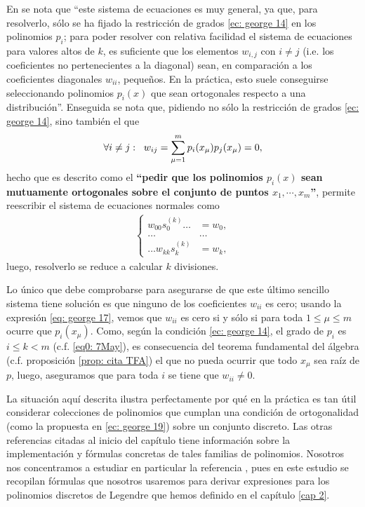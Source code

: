 \noindent
En \cite{george} se nota que ``este sistema de ecuaciones
es muy general, ya que, para resolverlo, sólo se ha fijado la 
restricción de grados
\eqref{ec: george 14} en los polinomios $p_{i}$; para poder
resolver con relativa facilidad el sistema
de ecuaciones para valores altos de $k$, es suficiente
que los elementos $w_{i,j}$ con $i \neq j$
(i.e. los coeficientes no pertenecientes a la 
diagonal) sean, en comparación a los coeficientes diagonales
$w_{ii}$, pequeños. En la práctica, esto suele conseguirse 
seleccionando polinomios $p_{i}(x)$ que sean ortogonales
respecto a una distribución''.
Enseguida se nota que, pidiendo no sólo 
la restricción de grados \eqref{ec: george 14}, sino también
el que
\begin{equation}
\label{ec: george 19}
\forall i \neq j: \hspace{0.2cm}
w_{ij} = \sum\limits_{\mu=1}^{m}p_{i}(x_{\mu}) p_{j} (x_{\mu}) = 0,
\end{equation}
hecho que es descrito como el 
\textbf{``pedir que los polinomios $p_{i}(x)$
sean mutuamente ortogonales sobre el conjunto de puntos
$x_{1}, \cdots, x_{m}$''}, permite reescribir el sistema de ecuaciones 
normales como 
\begin{align*}
\begin{cases}
w_{00}s_{0}^{(k)} \ldots & = w_{0}, \\
\ldots & \ldots \\
 \ldots  w_{kk}s_{k}^{(k)} & = w_{k},
\end{cases}
\end{align*}
luego, resolverlo se reduce a calcular $k$ divisiones. 

\begin{nota}
Lo único que debe comprobarse para asegurarse de que 
este último sencillo sistema tiene solución
es que ninguno de los coeficientes $w_{ii}$ es cero;
usando la expresión \eqref{eq: george 17}, vemos 
que 
$w_{ii}$ es cero si y sólo si 
para toda $1 \leq \mu \leq m $ ocurre que
$p_{i}(x_{\mu})$. Como, según la condición 
\eqref{ec: george 14}, el grado de
$p_{i}$ es $i \leq k < m$
(c.f. \eqref{eq0: 7May}), 
es consecuencia del teorema fundamental del
álgebra 
(c.f. proposición \ref{prop: cita TFA})
el que no pueda ocurrir que todo 
$x_{\mu}$ sea raíz de $p$, luego, aseguramos
que para toda $i$ se tiene que $w_{ii} \neq 0$.
\end{nota}

La situación aquí descrita ilustra perfectamente 
por qué en la práctica es tan útil considerar
colecciones de polinomios que cumplan una condición de 
ortogonalidad (como la propuesta en \eqref{ec: george 19})
sobre un conjunto discreto.
Las otras referencias citadas al inicio del capítulo
tiene información sobre la implementación y fórmulas
concretas de tales familias de polinomios. Nosotros nos
concentramos a estudiar en particular
la referencia \cite{Neuman}, pues en 
este estudio se recopilan fórmulas que nosotros usaremos
para derivar expresiones para los
polinomios discretos de Legendre que hemos definido en el capítulo 
\ref{cap 2}.

